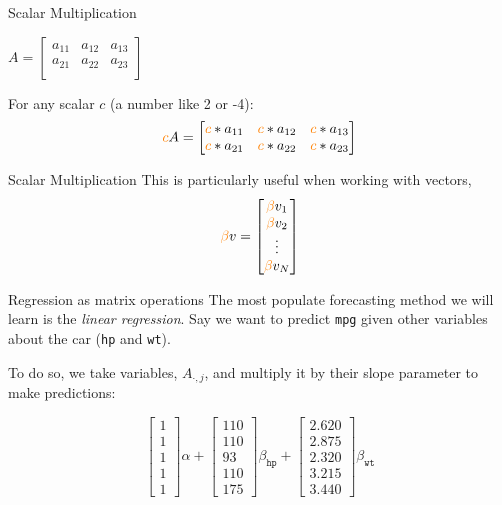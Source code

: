 \documentclass[aspectratio=169,t,11pt,table]{beamer}
\begin{document}
\begin{frame}{Scalar Multiplication}
  \begin{center}
    $A = \begin{bmatrix}
      a_{11} & a_{12} & a_{13} \\
      a_{21} & a_{22} & a_{23} \\
    \end{bmatrix}$
  \end{center}

  For any scalar $c$ (a number like 2 or -4): 
  $$
    {\color{orange} c} A = \begin{bmatrix}
      {\color{orange} c} * a_{11} & {\color{orange} c} * a_{12} & {\color{orange} c} * a_{13} \\
      {\color{orange} c} * a_{21} & {\color{orange} c} * a_{22} & {\color{orange} c} * a_{23} \\
    \end{bmatrix}
  $$
\end{frame}

\begin{frame}{Scalar Multiplication}
  This is particularly useful when working with vectors, 
  $$
    {\color{orange} \beta} v = \begin{bmatrix}{\color{orange} \beta} v_1 \\ {\color{orange} \beta} v_2 \\ \vdots \\ {\color{orange} \beta} v_N\end{bmatrix}
  $$
\end{frame}

\begin{frame}{Regression as matrix operations}
  The most populate forecasting method we will learn is the \emph{linear regression}. Say we want to predict \texttt{mpg} given other variables about the car (\texttt{hp} and \texttt{wt}). 

  \bigskip
  To do so, we take variables, $A_{\cdot, j}$, and multiply it by their slope parameter to make predictions:

  $$
    \begin{bmatrix}1 \\ 1 \\ 1 \\ 1 \\ 1\end{bmatrix} \alpha + 
    \begin{bmatrix}110 \\ 110 \\ 93 \\ 110 \\ 175\end{bmatrix} \beta_{\texttt{hp}} + 
    \begin{bmatrix}2.620 \\ 2.875 \\ 2.320 \\ 3.215 \\ 3.440\end{bmatrix} \beta_{\texttt{wt}}
  $$
\end{frame}
\end{document}
